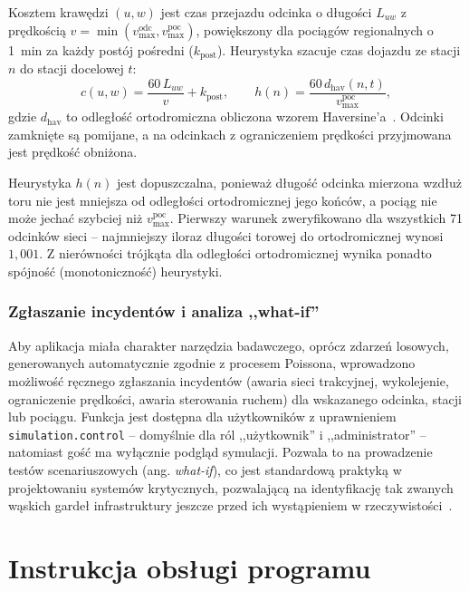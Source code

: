 \documentclass[twoside]{projektInzynierskiMS1z}
\begin{document}
Kosztem krawędzi $(u,w)$ jest czas przejazdu odcinka o długości $L_{uw}$
z prędkością $v=\min(v^{\mathrm{odc}}_{\max}, v^{\mathrm{poc}}_{\max})$,
powiększony dla pociągów regionalnych o 1~min za każdy postój pośredni
($k_{\mathrm{post}}$). Heurystyka szacuje czas dojazdu ze stacji $n$ do stacji
docelowej $t$:
\begin{equation}
c(u,w) = \frac{60\,L_{uw}}{v} + k_{\mathrm{post}}, \qquad
h(n) = \frac{60\, d_{\mathrm{hav}}(n, t)}{v^{\mathrm{poc}}_{\max}},
\end{equation}
gdzie $d_{\mathrm{hav}}$ to odległość ortodromiczna obliczona wzorem
Haversine'a~\cite{haversine}. Odcinki zamknięte są pomijane, a na odcinkach
z ograniczeniem prędkości przyjmowana jest prędkość obniżona.

Heurystyka $h(n)$ jest dopuszczalna, ponieważ długość odcinka mierzona wzdłuż
toru nie jest mniejsza od odległości ortodromicznej jego końców, a pociąg nie
może jechać szybciej niż $v^{\mathrm{poc}}_{\max}$. Pierwszy warunek
zweryfikowano dla wszystkich 71 odcinków sieci -- najmniejszy iloraz długości
torowej do ortodromicznej wynosi $1{,}001$. Z nierówności trójkąta dla odległości
ortodromicznej wynika ponadto spójność (monotoniczność) heurystyki.

\subsubsection{Zgłaszanie incydentów i analiza ,,what-if''}

Aby aplikacja miała charakter narzędzia badawczego, oprócz zdarzeń losowych,
generowanych automatycznie zgodnie z procesem Poissona, wprowadzono możliwość
ręcznego zgłaszania incydentów (awaria sieci trakcyjnej, wykolejenie,
ograniczenie prędkości, awaria sterowania ruchem) dla wskazanego odcinka,
stacji lub pociągu. Funkcja jest dostępna dla użytkowników z uprawnieniem
\texttt{simulation.control} -- domyślnie dla ról ,,użytkownik'' i
,,administrator'' -- natomiast gość ma wyłącznie podgląd symulacji. Pozwala to
na prowadzenie testów scenariuszowych (ang. \emph{what-if}), co jest standardową
praktyką w projektowaniu systemów krytycznych, pozwalającą na identyfikację tak
zwanych wąskich gardeł infrastruktury jeszcze przed ich wystąpieniem
w rzeczywistości~\cite{sommerville2016}.

\section{Instrukcja obsługi programu}
\end{document}
